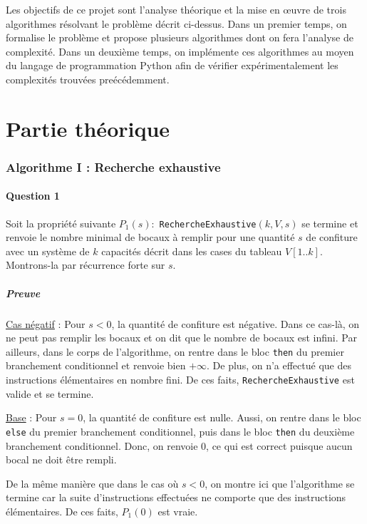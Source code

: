 \documentclass[12pt,a4paper]{article}
\begin{document}
\bigskip
Les objectifs de ce projet sont l'analyse th\'eorique et la mise en \oe uvre de trois algorithmes r\'esolvant le probl\`eme d\'ecrit ci-dessus. Dans un premier temps, on formalise le probl\`eme et propose plusieurs algorithmes dont on fera l'analyse de complexit\'e. Dans un deuxi\`eme temps, on impl\'emente ces algorithmes au moyen du langage de programmation Python afin de v\'erifier exp\'erimentalement les complexit\'es trouv\'ees pre\'ec\'edemment.

\newpage
\part{Partie th\'eorique}

\section{Algorithme I : Recherche exhaustive}

\subsection*{Question 1}
Soit la propri\'et\'e suivante \( P_{1}(s) : \) \texttt{RechercheExhaustive}$(k,V,s)$ se termine et renvoie le nombre minimal de bocaux \`a remplir pour une quantit\'e $s$ de confiture avec un syst\`eme de $k$ capacit\'es d\'ecrit dans les cases du tableau $V[1..k]$.
Montrons-la par r\'ecurrence forte sur $s$.

\subsubsection*{Preuve}
\underline{Cas n\'egatif} : Pour $s < 0$, la quantit\'e de confiture est n\'egative. Dans ce cas-l\`a, on ne peut pas remplir les bocaux et on dit que le nombre de bocaux est infini. 
Par ailleurs, dans le corps de l'algorithme, on rentre dans le bloc \texttt{then} du premier branchement conditionnel et renvoie bien $+\infty$. De plus, on n'a effectu\'e que des instructions \'el\'ementaires en nombre fini.
De ces faits, \texttt{RechercheExhaustive} est valide et se termine.

\medskip
\underline{Base} : Pour \( s = 0\), la quantit\'e de confiture est nulle. Aussi, on rentre dans le bloc \texttt{else} du premier branchement conditionnel, puis dans le bloc \texttt{then} du deuxi\`eme branchement conditionnel. Donc, on renvoie $0$, ce qui est correct puisque aucun bocal ne doit \^etre rempli.

De la m\^eme mani\`ere que dans le cas o\`u $s<0$, on montre ici que l'algorithme se termine car la suite d'instructions effectu\'ees ne comporte que des instructions \'el\'ementaires.
De ces faits, $P_{1}(0)$ est vraie.
\end{document}
